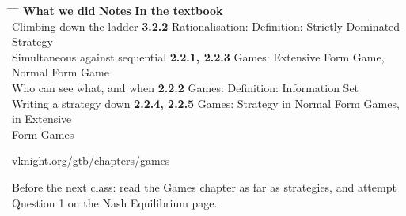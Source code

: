\hspace{0.3cm}
\begin{minipage}{0.95\linewidth}
\begin{tabbing}
\hspace{6.9cm} \= \hspace{3.0cm} \= \hspace{9.4cm} \= \kill
\textbf{What we did} \> {\color{inkteal}\textbf{Notes}} \> \textbf{In the textbook} \>
  \\[0.5em]
Climbing down the ladder \> {\color{inkteal}\textbf{3.2.2}} \> Rationalisation:
  Definition: Strictly Dominated \> \\
\> \> Strategy \> \\[0.45em]
Simultaneous against sequential \> {\color{inkteal}\textbf{2.2.1, 2.2.3}} \> Games:
  Extensive Form Game, Normal Form Game \> \\[0.45em]
Who can see what, and when \> {\color{inkteal}\textbf{2.2.2}} \> Games: Definition:
  Information Set \> \\[0.45em]
Writing a strategy down \> {\color{inkteal}\textbf{2.2.4, 2.2.5}} \> Games: Strategy
  in Normal Form Games, in Extensive \> \\
\> \> Form Games \> 
\end{tabbing}
\end{minipage}

\vspace{0.45cm}

{\color{inkgrey} vknight.org/gtb/chapters/games}

\vspace{0.3cm}

{\large Before the next class: read the Games chapter as far as strategies, and attempt
  Question 1 on the Nash Equilibrium page.}



